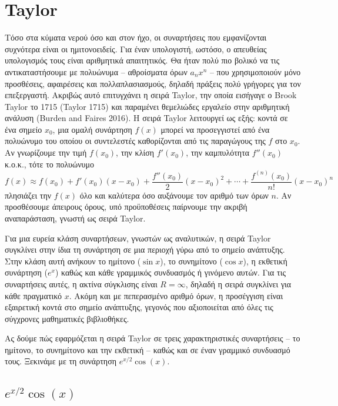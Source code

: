 \documentclass[a4paper, 11pt]{article}
\begin{document}
\section{Taylor}\label{taylor}

Τόσο στα κύματα νερού όσο και στον ήχο, οι συναρτήσεις που εμφανίζονται
συχνότερα είναι οι ημιτονοειδείς. Για έναν υπολογιστή, ωστόσο, ο
απευθείας υπολογισμός τους είναι αριθμητικά απαιτητικός. Θα ήταν πολύ
πιο βολικό να τις αντικαταστήσουμε με πολυώνυμα -- αθροίσματα όρων
\(a_n x^n\) -- που χρησιμοποιούν μόνο προσθέσεις, αφαιρέσεις και
πολλαπλασιασμούς, δηλαδή πράξεις πολύ γρήγορες για τον επεξεργαστή.
Ακριβώς αυτό επιτυγχάνει η σειρά Taylor, την οποία εισήγαγε ο Brook
Taylor το 1715 (Taylor 1715) και παραμένει θεμελιώδες εργαλείο στην
αριθμητική ανάλυση (Burden and Faires 2016). Η σειρά Taylor λειτουργεί
ως εξής: κοντά σε ένα σημείο \(x_0\), μια ομαλή συνάρτηση \(f(x)\)
μπορεί να προσεγγιστεί από ένα πολυώνυμο του οποίου οι συντελεστές
καθορίζονται από τις παραγώγους της \(f\) στο \(x_0\). Αν γνωρίζουμε την
τιμή \(f(x_0)\), την κλίση \(f'(x_0)\), την καμπυλότητα \(f''(x_0)\)
κ.ο.κ., τότε το πολυώνυμο
\[ f(x) \approx f(x_0) + f'(x_0)(x-x_0) + \frac{f''(x_0)}{2}(x-x_0)^2 + \cdots + \frac{f^{(n)}(x_0)}{n!}(x-x_0)^n \]
πλησιάζει την \(f(x)\) όλο και καλύτερα όσο αυξάνουμε τον αριθμό των
όρων \(n\). Αν προσθέσουμε άπειρους όρους, υπό προϋποθέσεις παίρνουμε
την ακριβή αναπαράσταση, γνωστή ως σειρά Taylor.

Για μια ευρεία κλάση συναρτήσεων, γνωστών ως αναλυτικών, η σειρά Taylor
συγκλίνει στην ίδια τη συνάρτηση σε μια περιοχή γύρω από το σημείο
ανάπτυξης. Στην κλάση αυτή ανήκουν το ημίτονο (\(\sin x\)), το
συνημίτονο (\(\cos x\)), η εκθετική συνάρτηση (\(e^x\)) καθώς και κάθε
γραμμικός συνδυασμός ή γινόμενο αυτών. Για τις συναρτήσεις αυτές, η
ακτίνα σύγκλισης είναι \(R = \infty\), δηλαδή η σειρά συγκλίνει για κάθε
πραγματικό \(x\). Ακόμη και με πεπερασμένο αριθμό όρων, η προσέγγιση
είναι εξαιρετική κοντά στο σημείο ανάπτυξης, γεγονός που αξιοποιείται
από όλες τις σύγχρονες μαθηματικές βιβλιοθήκες.

Ας δούμε πώς εφαρμόζεται η σειρά Taylor σε τρεις χαρακτηριστικές
συναρτήσεις -- το ημίτονο, το συνημίτονο και την εκθετική -- καθώς και
σε έναν γραμμικό συνδυασμό τους. Ξεκινάμε με τη συνάρτηση
\(e^{x/2}\cos(x)\).

\subsection{\texorpdfstring{\(e^{x/2}\cos(x)\)}{e\^{}\{x/2\}\textbackslash cos(x)}}\label{ex2cosx}
\end{document}
